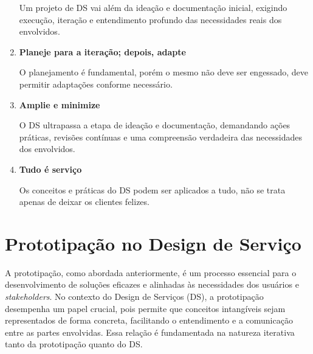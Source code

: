 \begin{enumerate}
	Um projeto de DS vai além da ideação e documentação inicial, exigindo execução, iteração e entendimento profundo das necessidades reais dos envolvidos.
	
	\item \textbf{Planeje para a iteração; depois, adapte}
	
	O planejamento é fundamental, porém o mesmo não deve ser engessado, deve permitir adaptações conforme necessário.
	
	\item \textbf{Amplie e minimize}
	
	O DS ultrapassa a etapa de ideação e documentação, demandando ações práticas, revisões contínuas e uma compreensão verdadeira das necessidades dos envolvidos.
	
	\item \textbf{Tudo é serviço}
	
	Os conceitos e práticas do DS podem ser aplicados a tudo, não se trata apenas de deixar os clientes felizes.
	
\end{enumerate}

\section{Prototipação no Design de Serviço}

A prototipação, como abordada anteriormente, é um processo essencial para o desenvolvimento de soluções eficazes e alinhadas às necessidades dos usuários e \textit{stakeholders}. No contexto do Design de Serviços (DS), a prototipação desempenha um papel crucial, pois permite que conceitos intangíveis sejam representados de forma concreta, facilitando o entendimento e a comunicação entre as partes envolvidas. Essa relação é fundamentada na natureza iterativa tanto da prototipação quanto do DS.


